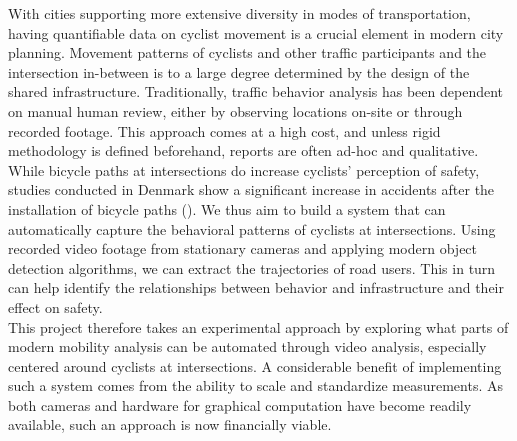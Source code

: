 With cities supporting more extensive diversity in modes of transportation,
having quantifiable data on cyclist movement is a crucial element in modern city planning. 
Movement patterns of cyclists and other traffic participants and the intersection in-between 
is to a large degree determined by the design of the shared infrastructure. 
Traditionally, traffic behavior analysis has been dependent on manual human review, either by observing locations on-site or through recorded footage. 
This approach comes at a high cost, and unless rigid methodology is defined beforehand, reports are often ad-hoc and qualitative. 
\ \\

While bicycle paths at intersections do increase cyclists' perception of safety, 
studies conducted in Denmark show a significant increase in accidents after the installation of bicycle paths (\cite{intersection_safety}).
We thus aim to build a system that can automatically capture the behavioral patterns of cyclists at intersections.
Using recorded video footage from stationary cameras and applying modern object detection algorithms, 
we can extract the trajectories of road users. 
This in turn can help identify the relationships between behavior and infrastructure and their effect on safety. 
\ \\

This project therefore takes an experimental approach by exploring what parts of modern mobility analysis can be automated
through video analysis, especially centered around cyclists at intersections.
A considerable benefit of implementing such a system comes from the ability to scale and standardize measurements.
As both cameras and hardware for graphical computation have become readily available, such an approach is now financially viable.
